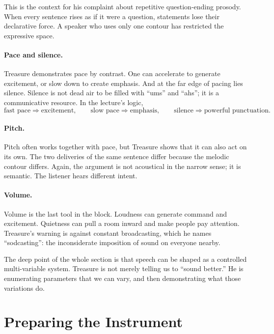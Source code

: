 This is the context for his complaint about repetitive question-ending prosody. When every sentence rises as if it were a question, statements lose their declarative force. A speaker who uses only one contour has restricted the expressive space.

\paragraph{Pace and silence.} Treasure demonstrates pace by contrast. One can accelerate to generate excitement, or slow down to create emphasis. And at the far edge of pacing lies silence. Silence is not dead air to be filled with ``ums'' and ``ahs''; it is a communicative resource. In the lecture's logic,
\begin{equation}
\text{fast pace} \Rightarrow \text{excitement},
\qquad
\text{slow pace} \Rightarrow \text{emphasis},
\qquad
\text{silence} \Rightarrow \text{powerful punctuation}.
\end{equation}

\paragraph{Pitch.} Pitch often works together with pace, but Treasure shows that it can also act on its own. The two deliveries of the same sentence differ because the melodic contour differs. Again, the argument is not acoustical in the narrow sense; it is semantic. The listener hears different intent.

\paragraph{Volume.} Volume is the last tool in the block. Loudness can generate command and excitement. Quietness can pull a room inward and make people pay attention. Treasure's warning is against constant broadcasting, which he names ``sodcasting'': the inconsiderate imposition of sound on everyone nearby.

The deep point of the whole section is that speech can be shaped as a controlled multi-variable system. Treasure is not merely telling us to ``sound better.'' He is enumerating parameters that we can vary, and then demonstrating what those variations do.

\section{Preparing the Instrument}

